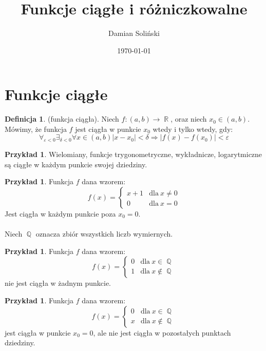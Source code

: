 ﻿\documentclass[12pt,a4paper]{article}
\title{Funkcje ciągłe i różniczkowalne}
\date{\today}
\author{Damian Soliński}
\theoremstyle{definition}
\newtheorem{df}[tw]{Definicja}
\newtheorem{ex}[tw]{Przykład}
\DeclareMathOperator{\R}{\mathbb{R}}
\DeclareMathOperator{\Q}{\mathbb{Q}}
\begin{document}
 
\maketitle

\tableofcontents

\section{Funkcje ciągłe}

\begin{df}
(funkcja ciągła). Niech $f:(a,b)\to\R$, oraz niech $x_0\in(a,b)$. Mówimy, że funkcja $f$ jest ciągła w punkcie $x_0$ wtedy i tylko wtedy, gdy:
\[\forall_{\varepsilon<0}\exists_{\delta<0}\forall x\in(a,b)|x-x_0|<\delta\Rightarrow|f(x)-f(x_0)|<\varepsilon\]
\end{df}

\begin{ex}
Wielomiany, funkcje trygonometryczne, wykładnicze, logarytmiczne są ciągłe w każdym punkcie swojej dziedziny.
\end{ex}

\begin{ex}
Funkcja $f$ dana wzorem:
\[f(x)=\left\{\begin{array}{ll}x+1&\mbox{dla}\ x\neq0\\0&\mbox{dla}\ x=0\end{array}\right.\]
Jest ciągła w każdym punkcie poza $x_0 = 0$.
\\\\ Niech $\Q$ oznacza zbiór wszystkich liczb wymiernych.
\end{ex}

\begin{ex}
Funkcja $f$ dana wzorem:
\[f(x)=\left\{\begin{array}{ll}0&\mbox{dla}\ x\in\Q\\1&\mbox{dla}\ x\not\in\Q\end{array}\right.\]
nie jest ciągła w żadnym punkcie.
\end{ex}

\begin{ex}
Funkcja $f$ dana wzorem:
\[f(x)=\left\{\begin{array}{ll}0&\mbox{dla}\ x\in\Q\\x&\mbox{dla}\ x\not\in\Q\end{array}\right.\]
jest ciągła w punkcie $x_0=0$, ale nie jest ciągła w pozostałych punktach dziedziny.
\end{ex}
\end{document}
